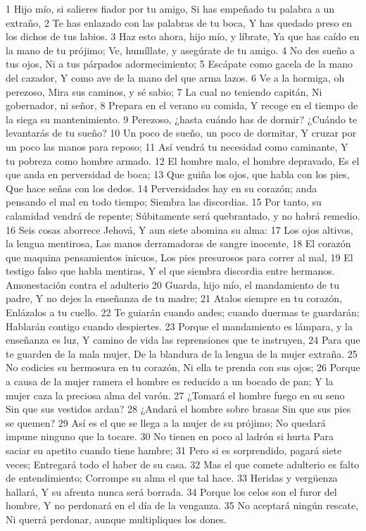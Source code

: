 1 Hijo mío, si salieres fiador por tu amigo,
Si has empeñado tu palabra a un extraño,
2 Te has enlazado con las palabras de tu boca,
Y has quedado preso en los dichos de tus labios.
3 Haz esto ahora, hijo mío, y líbrate,
Ya que has caído en la mano de tu prójimo;
Ve, humíllate, y asegúrate de tu amigo.
4 No des sueño a tus ojos,
Ni a tus párpados adormecimiento;
5 Escápate como gacela de la mano del cazador,
Y como ave de la mano del que arma lazos.
6 Ve a la hormiga, oh perezoso,
Mira sus caminos, y sé sabio;
7 La cual no teniendo capitán,
Ni gobernador, ni señor,
8 Prepara en el verano su comida,
Y recoge en el tiempo de la siega su mantenimiento.
9 Perezoso, ¿hasta cuándo has de dormir?
¿Cuándo te levantarás de tu sueño?
10 Un poco de sueño, un poco de dormitar, 
Y cruzar por un poco las manos para reposo;
11 Así vendrá tu necesidad como caminante,
Y tu pobreza como hombre armado. 
12 El hombre malo, el hombre depravado,
Es el que anda en perversidad de boca;
13 Que guiña los ojos, que habla con los pies,
Que hace señas con los dedos.
14 Perversidades hay en su corazón; anda pensando el mal en todo tiempo;
Siembra las discordias.
15 Por tanto, su calamidad vendrá de repente;
Súbitamente será quebrantado, y no habrá remedio.
16 Seis cosas aborrece Jehová,
Y aun siete abomina su alma:
17 Los ojos altivos, la lengua mentirosa,
Las manos derramadoras de sangre inocente,
18 El corazón que maquina pensamientos inicuos,
Los pies presurosos para correr al mal,
19 El testigo falso que habla mentiras,
Y el que siembra discordia entre hermanos.
Amonestación contra el adulterio
20 Guarda, hijo mío, el mandamiento de tu padre,
Y no dejes la enseñanza de tu madre;
21 Atalos siempre en tu corazón,
Enlázalos a tu cuello.
22 Te guiarán cuando andes; cuando duermas te guardarán;
Hablarán contigo cuando despiertes.
23 Porque el mandamiento es lámpara, y la enseñanza es luz,
Y camino de vida las reprensiones que te instruyen,
24 Para que te guarden de la mala mujer,
De la blandura de la lengua de la mujer extraña.
25 No codicies su hermosura en tu corazón,
Ni ella te prenda con sus ojos;
26 Porque a causa de la mujer ramera el hombre es reducido a un bocado de pan;
Y la mujer caza la preciosa alma del varón.
27 ¿Tomará el hombre fuego en su seno
Sin que sus vestidos ardan?
28 ¿Andará el hombre sobre brasas
Sin que sus pies se quemen?
29 Así es el que se llega a la mujer de su prójimo;
No quedará impune ninguno que la tocare.
30 No tienen en poco al ladrón si hurta
Para saciar su apetito cuando tiene hambre;
31 Pero si es sorprendido, pagará siete veces;
Entregará todo el haber de su casa.
32 Mas el que comete adulterio es falto de entendimiento;
Corrompe su alma el que tal hace.
33 Heridas y vergüenza hallará,
Y su afrenta nunca será borrada.
34 Porque los celos son el furor del hombre,
Y no perdonará en el día de la venganza.
35 No aceptará ningún rescate,
Ni querrá perdonar, aunque multipliques los dones.


